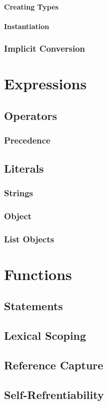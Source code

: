 \documentclass[12pt,letterpaper]{report}
\begin{document}
\subsubsection{Creating Types}
\subsubsection{Instantiation}
\subsection{Implicit Conversion}
\chapter{Expressions}
\section{Operators}
\subsection{Precedence}
\section{Literals}
\subsection{Strings}
\subsection{Object}
\subsection{List Objects}
\chapter{Functions}
\section{Statements}
\section{Lexical Scoping}
\section{Reference Capture}
\section{Self-Refrentiability}
\end{document}
